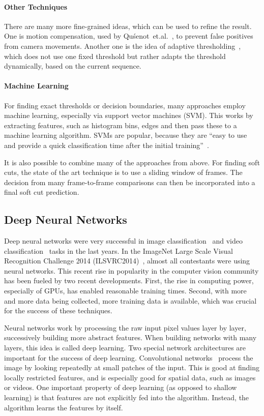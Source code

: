 \paragraph{Other Techniques}
There are many more fine-grained ideas, which can be used to refine the result.
One is motion compensation, used by Qu{\'s}enot~et.al.~\cite{qousenot2003clips}, to prevent false positives from camera movements.
Another one is the idea of adaptive thresholding~\cite{volkmer2004rmit}, which does not use one fixed threshold but rather adapts the threshold dynamically, based on the current sequence.

\paragraph{Machine Learning}
For finding exact thresholds or decision boundaries, many approaches employ machine learning, especially via support vector machines (SVM).
This works by extracting features, such as histogram bins, edges and then pass these to a machine learning algorithm.
SVMs are popular, because they are ``easy to use and provide a quick classification time after the initial training''~\cite{smeaton2010video}.


It is also possible to combine many of the approaches from above.
For finding soft cuts, the state of the art technique is to use a sliding window of frames.
The decision from many frame-to-frame comparisons can then be incorporated into a final soft cut prediction.

\subsection{Deep Neural Networks}
Deep neural networks were very successful in image classification~\cite{krizhevsky2012imagenet} and video classification~\cite{karpathy2014large} tasks in the last years.
In the ImageNet Large Scale Visual Recognition Challenge 2014 (ILSVRC2014)~\cite{imagenet}, almost all contestants were using neural networks.
This recent rise in popularity in the computer vision community has been fueled by two recent developments.
First, the rise in computing power, especially of GPUs, has enabled reasonable training times.
Second, with more and more data being collected, more training data is available, which was crucial for the success of these techniques.

Neural networks work by processing the raw input pixel values layer by layer, successively building more abstract features.
When building networks with many layers, this idea is called deep learning.
Two special network architectures are important for the success of deep learning.
Convolutional networks~\cite{lecun1998gradient} process the image by looking repeatedly at small patches of the input.
This is good at finding locally restricted features, and is especially good for spatial data, such as images or videos.
One important property of deep learning (as opposed to shallow learning) is that features are not explicitly fed into the algorithm. Instead, the algorithm learns the features by itself.

